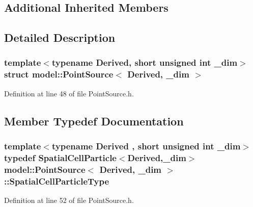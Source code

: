 \subsection*{Additional Inherited Members}


\subsection{Detailed Description}
\subsubsection*{template$<$typename Derived, short unsigned int \+\_\+dim$>$struct model\+::\+Point\+Source$<$ Derived, \+\_\+dim $>$}



Definition at line 48 of file Point\+Source.\+h.



\subsection{Member Typedef Documentation}
\hypertarget{structmodel_1_1_point_source_3_01_derived_00_01__dim_01_4_ae1a1968c44182d8ef71790106b047c69}{}
\subsubsection[{Spatial\+Cell\+Particle\+Type}]{\setlength{\rightskip}{0pt plus 5cm}template$<$typename Derived , short unsigned int \+\_\+dim$>$ typedef {\bf Spatial\+Cell\+Particle}$<$Derived,\+\_\+dim$>$ {\bf model\+::\+Point\+Source}$<$ Derived, \+\_\+dim $>$\+::{\bf Spatial\+Cell\+Particle\+Type}}\label{structmodel_1_1_point_source_3_01_derived_00_01__dim_01_4_ae1a1968c44182d8ef71790106b047c69}


Definition at line 52 of file Point\+Source.\+h.

\hypertarget{structmodel_1_1_point_source_3_01_derived_00_01__dim_01_4_ad99dbf80854dcb7b7360d590c9c17191}{}
